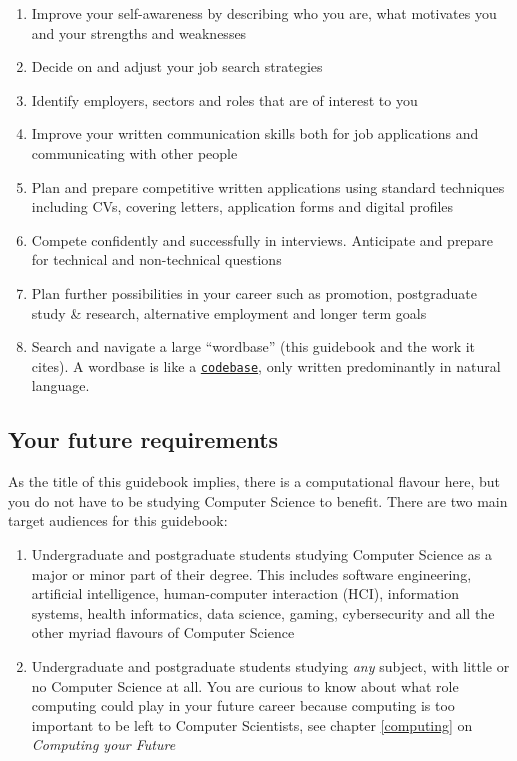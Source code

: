 \documentclass[
]{book}
\providecommand{\tightlist}{%
  \setlength{\itemsep}{0pt}\setlength{\parskip}{0pt}}
\begin{document}
\begin{enumerate}
\def\labelenumi{\arabic{enumi}.}
\tightlist
\item
  Improve your self-awareness by describing who you are, what motivates you and your strengths and weaknesses
\item
  Decide on and adjust your job search strategies
\item
  Identify employers, sectors and roles that are of interest to you\\
\item
  Improve your written communication skills both for job applications and communicating with other people
\item
  Plan and prepare competitive written applications using standard techniques including CVs, covering letters, application forms and digital profiles
\item
  Compete confidently and successfully in interviews. Anticipate and prepare for technical and non-technical questions
\item
  Plan further possibilities in your career such as promotion, postgraduate study \& research, alternative employment and longer term goals
\item
  Search and navigate a large ``wordbase'' (this guidebook and the work it cites). A wordbase is like a \href{https://en.wikipedia.org/wiki/Codebase}{\texttt{codebase}}, only written predominantly in natural language.
\end{enumerate}

\hypertarget{prereq}{%
\subsection{Your future requirements}\label{prereq}}

As the title of this guidebook implies, there is a computational flavour here, but you do not have to be studying Computer Science to benefit. There are two main target audiences for this guidebook:

\begin{enumerate}
\def\labelenumi{\arabic{enumi}.}
\tightlist
\item
  Undergraduate and postgraduate students studying Computer Science as a major or minor part of their degree. This includes software engineering, artificial intelligence, human-computer interaction (HCI), information systems, health informatics, data science, gaming, cybersecurity and all the other myriad flavours of Computer Science
\item
  Undergraduate and postgraduate students studying \emph{any} subject, with little or no Computer Science at all. You are curious to know about what role computing could play in your future career because computing is too important to be left to Computer Scientists, see chapter \ref{computing} on \emph{Computing your Future}
\end{enumerate}
\end{document}
